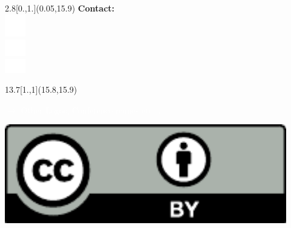
\begin{textblock}{2.8}[0.,1.](0.05,15.9)
{\large \sffamily \color{white}
  \noindent \textbf{Contact: \iauthor}\\
\includegraphics[width=9mm,clip]{mastodon-logo-white.pdf} \imast\\ 
\includegraphics[width=9mm,clip]{Twitter_logo_white.pdf} \itweet\\ 
\includegraphics[width=9mm,clip]{e_mail} \iemail
}\end{textblock}






\begin{textblock}{13.7}[1.,1](15.8,15.9)
    \begin{minipage}[b][4.4cm][c]{0.8\textwidth}\flushright
    \textcolor{white}{{\Large  $\rightarrow$ Other Logos, Conference names etc \ldots}}
  \end{minipage}
  \begin{minipage}[b][4.4cm][c]{0.2\textwidth}\flushright
    \noindent\includegraphics[height=4.3cm,clip]{CCby}
  \end{minipage}
\end{textblock}

	      

